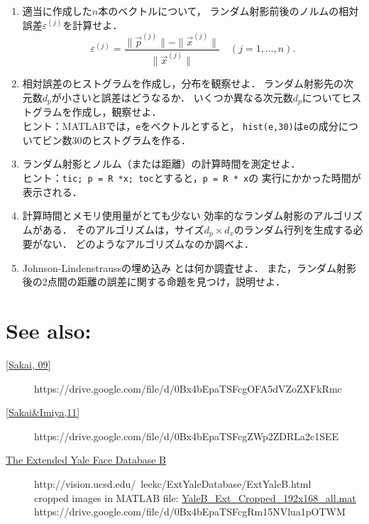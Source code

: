 \begin{enumerate}
\item
適当に作成した$n$本のベクトルについて，
ランダム射影前後のノルムの相対誤差$\varepsilon^{(j)}$を計算せよ．
\[
  \varepsilon^{(j)}=\frac{\|\vec p^{(j)}\|-\|\vec x^{(j)}\|}{\|\vec x^{(j)}\|}\quad (j=1,\dots,n).
\]
\item
相対誤差のヒストグラムを作成し，分布を観察せよ．
ランダム射影先の次元数$d_p$が小さいと誤差はどうなるか．
いくつか異なる次元数$d_p$についてヒストグラムを作成し，観察せよ．\\
ヒント：MATLABでは，{\tt e}をベクトルとすると，
{\tt hist(e,30)}は{\tt e}の成分についてビン数30のヒストグラムを作る．
\item ランダム射影とノルム（または距離）の計算時間を測定せよ．\\
ヒント：{\tt tic; p = R *x; toc}とすると，{\tt p = R * x}の
実行にかかった時間が表示される．
\item\yeeks
計算時間とメモリ使用量がとても少ない
効率的なランダム射影のアルゴリズムがある\cite{Sakai09ERPj,tsakaiAPR11}．
そのアルゴリズムは，サイズ$d_p\times d_x$のランダム行列を生成する必要がない．
どのようなアルゴリズムなのか調べよ．
\item\yeeks
Johnson-Lindenstraussの埋め込み\cite{JL84,Achlioptas03,Dasgupta99,Vempala04}
とは何か調査せよ．
また，ランダム射影後の2点間の距離の誤差に関する命題を見つけ，説明せよ．
\end{enumerate}



{\footnotesize

}

\section*{See also:}
{\footnotesize
\begin{description}
\item[\href{https://drive.google.com/file/d/0Bx4bEpaTSFcgOFA5dVZoZXFkRmc}{[Sakai, 09]}\cite{Sakai09ERPj}]
https://drive.google.com/file/d/0Bx4bEpaTSFcgOFA5dVZoZXFkRmc
\item[\href{https://drive.google.com/file/d/0Bx4bEpaTSFcgZWp2ZDRLa2c1SEE}{[Sakai\&Imiya,11]}\cite{tsakaiAPR11}]
https://drive.google.com/file/d/0Bx4bEpaTSFcgZWp2ZDRLa2c1SEE
\item[\href{http://vision.ucsd.edu/~leekc/ExtYaleDatabase/ExtYaleB.html}{The Extended Yale Face Database B}]
http://vision.ucsd.edu/~leekc/ExtYaleDatabase/ExtYaleB.html\\
cropped images in MATLAB file: \href{https://drive.google.com/file/d/0Bx4bEpaTSFcgRm15NVlua1pOTWM}{YaleB\_Ext\_Cropped\_192x168\_all.mat}\\
https://drive.google.com/file/d/0Bx4bEpaTSFcgRm15NVlua1pOTWM
\end{description}
}

